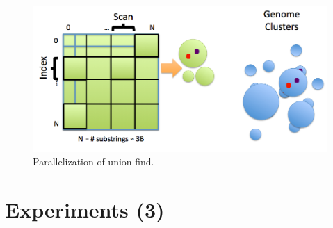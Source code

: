 \documentclass[10pt, conference, compsocconf]{IEEEtran}
\begin{document}
\begin{itemize}
\begin{itemize}
\begin{figure}
\centering
\includegraphics[scale=0.4]{parallelUnionFind}
\caption{Parallelization of union find.}
\label{fig:parallelUnionFind}
\end{figure}

\end{itemize}
\end{itemize}


\section{Experiments (3)}
\end{document}
